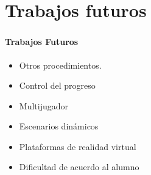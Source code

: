 \section{Trabajos futuros}
\setcounter{sectiontotal}{1}

\begin{frame}
\frametitle{\pagetitle}
\framesubtitle{Trabajos Futuros}
\begin{itemize}[<+->]
    \item Otros procedimientos.
    \item Control del progreso
    \item Multijugador
    \item Escenarios dinámicos
    \item Plataformas de realidad virtual
    \item Dificultad de acuerdo al alumno
\end{itemize}
\end{frame}

